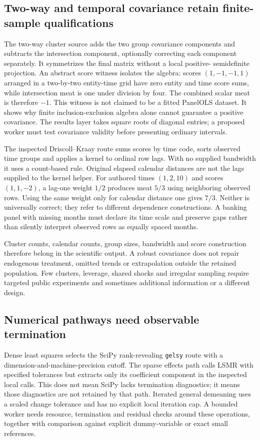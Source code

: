 \subsection{Two-way and temporal covariance retain finite-sample qualifications}
The two-way cluster source adds the two group covariance components and
subtracts the intersection component, optionally correcting each component
separately. It symmetrizes the final matrix without a local positive-
semidefinite projection. An abstract score witness isolates the algebra:
scores $(1,-1,-1,1)$ arranged in a two-by-two entity-time grid have zero
entity and time score sums, while intersection meat is one under division
by four. The combined scalar meat is therefore $-1$. This witness is not
claimed to be a fitted PanelOLS dataset. It shows why finite
inclusion-exclusion algebra alone cannot guarantee a positive covariance.
The results layer takes square roots of diagonal entries; a proposed worker
must test covariance validity before presenting ordinary intervals.
\citep{exec24_lmpanel_source,exec24_lmpanel_reference}

The inspected Driscoll--Kraay route sums scores by time code, sorts observed
time groups and applies a kernel to ordinal row lags. With no supplied
bandwidth it uses a count-based rule. Original elapsed calendar distances
are not the lags supplied to the kernel helper. For authored times
$(1,2,10)$ and scores $(1,1,-2)$, a lag-one weight $1/2$ produces meat
$5/3$ using neighboring observed rows. Using the same weight only for
calendar distance one gives $7/3$. Neither is universally correct; they
refer to different dependence constructions. A banking panel with missing
months must declare its time scale and preserve gaps rather than silently
interpret observed rows as equally spaced months.
\citep{exec24_lmpanel_source,exec24_lmpanel_reference}

Cluster counts, calendar counts, group sizes, bandwidth and score construction
therefore belong in the scientific output. A robust covariance does not
repair endogenous treatment, omitted trends or extrapolation outside the
retained population. Few clusters, leverage, shared shocks and irregular
sampling require targeted public experiments and sometimes additional
information or a different design.~\citep{exec24_lmpanel_reference}

\subsection{Numerical pathways need observable termination}
Dense least squares selects the SciPy rank-revealing \texttt{gelsy} route
with a dimension-and-machine-precision cutoff. The sparse effects path
calls LSMR with specified tolerances but extracts only its coefficient
component in the inspected local calls. This does not mean SciPy lacks
termination diagnostics; it means those diagnostics are not retained by
that path. Iterated general demeaning uses a scaled change tolerance and
has no explicit local iteration cap. A bounded worker needs resource,
termination and residual checks around these operations, together with
comparison against explicit dummy-variable or exact small references.
\citep{exec24_lmpanel_source}

